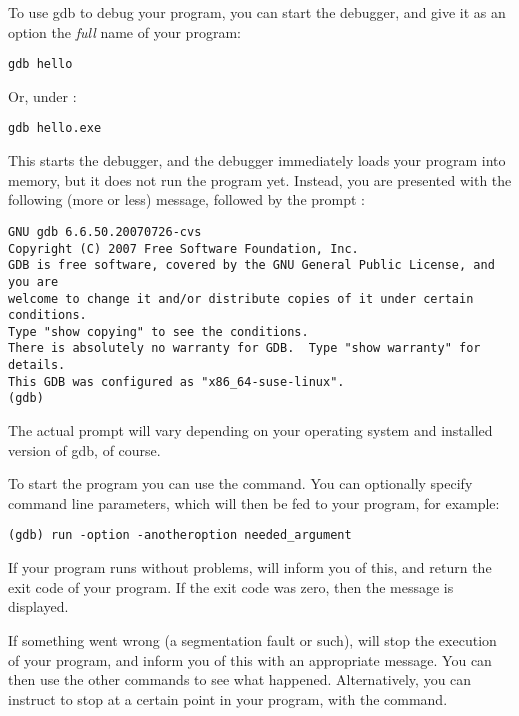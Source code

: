 To use gdb to debug your program, you can start the debugger, and give it as
an option the {\em full} name of your program:
\begin{verbatim}
gdb hello
\end{verbatim}
Or, under \dos :
\begin{verbatim}
gdb hello.exe
\end{verbatim}

This starts the debugger, and the debugger immediately loads your program
into memory, but it does not run the program yet. Instead, you are presented
with the following (more or less) message, followed by the  prompt
:
\begin{verbatim}
GNU gdb 6.6.50.20070726-cvs
Copyright (C) 2007 Free Software Foundation, Inc.
GDB is free software, covered by the GNU General Public License, and you are
welcome to change it and/or distribute copies of it under certain conditions.
Type "show copying" to see the conditions.
There is absolutely no warranty for GDB.  Type "show warranty" for details.
This GDB was configured as "x86_64-suse-linux".
(gdb)
\end{verbatim}
The actual prompt will vary depending on  your operating system and
installed version of gdb, of course.

To start the program you can use the  command. You can optionally
specify command line parameters, which will then be fed to your program, for
example:
\begin{verbatim}
(gdb) run -option -anotheroption needed_argument
\end{verbatim}
If your program runs without problems,  will inform you of this,
and return the exit code of your program. If the exit code was zero, then
the message  is displayed.

If something went wrong (a segmentation fault or such),  will stop
the execution of your program, and inform you of this with an appropriate
message. You can then use the other  commands to see what happened.
Alternatively, you can instruct  to stop at a certain point in your
program, with the  command.

